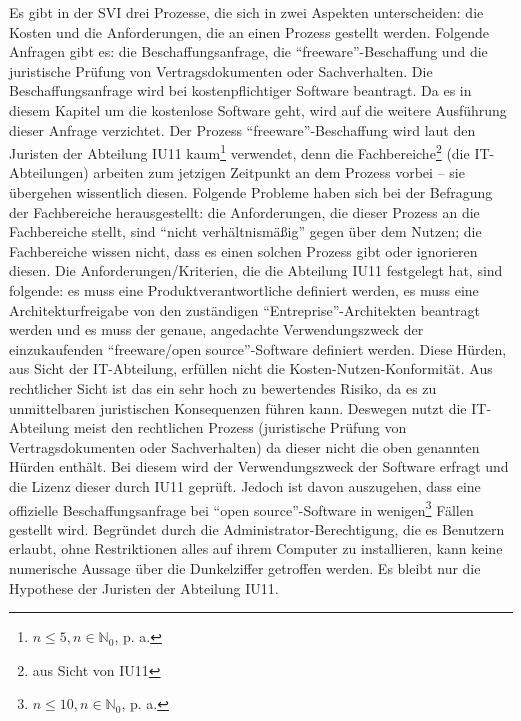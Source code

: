 Es gibt in der \ac{SVI} drei Prozesse, die sich in zwei Aspekten unterscheiden: die Kosten und die Anforderungen, die an einen Prozess gestellt werden. Folgende Anfragen gibt es: die Beschaffungsanfrage, die \enquote{freeware}-Beschaffung und die juristische Prüfung von Vertragsdokumenten oder Sachverhalten. Die Beschaffungsanfrage wird bei kostenpflichtiger Software beantragt. Da es in diesem Kapitel um die kostenlose Software geht, wird auf die weitere Ausführung dieser Anfrage verzichtet. Der Prozess \enquote{freeware}-Beschaffung wird laut den Juristen der Abteilung \ac{IU11} kaum\footnote{$ n \leq 5, n \in \mathbb{N}_{0} $, p. a.} verwendet, denn die Fachbereiche\footnote{aus Sicht von \ac{IU11}} (die IT-Abteilungen) arbeiten zum jetzigen Zeitpunkt an dem Prozess vorbei -- sie übergehen wissentlich diesen. Folgende Probleme haben sich bei der Befragung der Fachbereiche herausgestellt: die Anforderungen, die dieser Prozess an die Fachbereiche stellt, sind \enquote{nicht verhältnismäßig} gegen über dem Nutzen; die Fachbereiche wissen nicht, dass es einen solchen Prozess gibt oder ignorieren diesen. Die Anforderungen/Kriterien, die die Abteilung \ac{IU11} festgelegt hat, sind folgende: es muss eine Produktverantwortliche definiert werden, es muss eine Architekturfreigabe von den zuständigen \enquote{Entreprise}-Architekten beantragt werden und es muss der genaue, angedachte Verwendungszweck der einzukaufenden \enquote{freeware/open source}-Software definiert werden. Diese Hürden, aus Sicht der IT-Abteilung, erfüllen nicht die Kosten-Nutzen-Konformität. Aus rechtlicher Sicht ist das ein sehr hoch zu bewertendes Risiko, da es zu unmittelbaren juristischen Konsequenzen führen kann. Deswegen nutzt die IT-Abteilung meist den rechtlichen Prozess (juristische Prüfung von Vertragsdokumenten oder Sachverhalten) da dieser nicht die oben genannten Hürden enthält. Bei diesem wird der Verwendungszweck der Software erfragt und die Lizenz dieser durch \ac{IU11} geprüft. Jedoch ist davon auszugehen, dass eine offizielle Beschaffungsanfrage bei \enquote{open source}-Software in wenigen\footnote{$ n \leq 10, n \in \mathbb{N}_{0} $, p. a.} Fällen gestellt wird. Begründet durch die Administrator-Berechtigung, die es Benutzern erlaubt, ohne Restriktionen alles auf ihrem Computer zu installieren, kann keine numerische Aussage über die Dunkelziffer getroffen werden. Es bleibt nur die Hypothese der Juristen der Abteilung \ac{IU11}. \par
